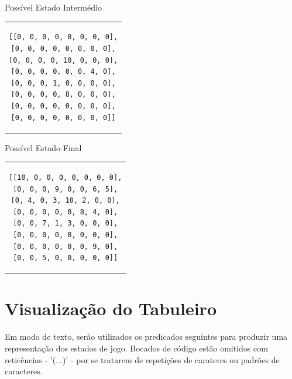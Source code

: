 \documentclass[a4paper]{article}
\begin{document}
\large Possível Estado Intermédio
\begin{center}
\begin{tabular}{c}
\begin{lstlisting}
[[0, 0, 0, 0, 0, 0, 0, 0],
[0, 0, 0, 0, 0, 0, 0, 0],
[0, 0, 0, 0, 10, 0, 0, 0],
[0, 0, 0, 0, 0, 0, 4, 0],
[0, 0, 0, 1, 0, 0, 0, 0],
[0, 0, 0, 0, 8, 0, 0, 0],
[0, 0, 0, 0, 0, 0, 0, 0],
[0, 0, 0, 0, 0, 0, 0, 0]]
\end{lstlisting}
\end{tabular}
\end{center}

\large Possível Estado Final
\begin{center}
\begin{tabular}{c}
\begin{lstlisting}
[[10, 0, 0, 0, 0, 0, 0, 0],
[0, 0, 0, 9, 0, 0, 6, 5],
[0, 4, 0, 3, 10, 2, 0, 0],
[0, 0, 0, 0, 0, 8, 4, 0],
[0, 0, 7, 1, 3, 0, 0, 0],
[0, 0, 0, 0, 8, 0, 0, 0],
[0, 0, 0, 0, 0, 0, 9, 0],
[0, 0, 5, 0, 0, 0, 0, 0]]
\end{lstlisting}
\end{tabular}
\end{center}


\section{Visualização do Tabuleiro}

Em modo de texto, serão utilizados os predicados seguintes para produzir uma representação dos estados de jogo. Bocados de código estão omitidos com reticências - '(...)' - por se tratarem de repetições de carateres ou padrões de caracteres.\linebreak
\end{document}

